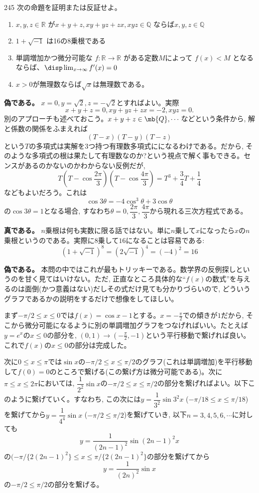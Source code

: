 \begin{thm}{245}{}{}
 次の命題を証明または反証せよ。
 \begin{enumerate}
  \item $x,y,z\in\mathbb{R}$ が$x+y+z,xy+yz+zx,xyz\in\mathbb{Q}$ ならば$x,y,z\in\mathbb{Q}$
  \item $1+\sqrt{-1}$ は16の8乗根である
  \item 単調増加かつ微分可能な $f:\mathbb{R}\rightarrow\mathbb{R}$ がある定数$M$によって $f(x)<M$ となるならば、$\disp \lim_{x\to\infty} f'(x)=0$
  \item $x>0$が無理数ならば$\sqrt{x}$は無理数である。
 \end{enumerate}
\end{thm}

\textbf{偽である。} $x=0, y=\sqrt{2}, z=-\sqrt{2}$とすればよい。実際
\[x+y+z = 0,  xy+yz+zx = -2, xyz = 0.\]
別のアプローチも述べておこう。$x+y+z\in \mb{Q},\cdots$などという条件から, 解と係数の関係をふまえれば
\[(T-x)(T-y)(T-z)\]
という$T$の多項式は実解を3つ持つ有理数多項式にになるわけである。だから, そのような多項式の根は果たして有理数なのか?という視点で解く事もできる。センスがあるのかないのかわからない反例だが,  
\[T(T-\cos{\dfrac{2\pi}{3}})(T-\cos{\dfrac{4\pi}{3}}) = T^3 + \dfrac{3}{4}T +\dfrac{1}{4}\]
などもよいだろう。これは
\[\cos{3\theta} = -4\cos^{3}{\theta} + 3\cos{\theta}\]
の$\cos{3\theta} = 1$となる場合, すなわち$\theta =0, \dfrac{2\pi}{3}, \dfrac{4\pi}{3}$から現れる三次方程式である。 

\textbf{真である。} $n$乗根は何も実数に限る話ではない。単に$n$乗して$x$になったら$x$の$n$乗根というのである。実際に8乗して$16$になることは容易である:
\[(1+\sqrt{-1})^8 = (2\sqrt{-1})^{4} = (-4)^2  = 16\]

\textbf{偽である。} 本問の中ではこれが最もトリッキーである。数学界の反例探しというのを甘く見てはいけない。ただ, 正直なところ具体的な``$f(x)$の数式''を与えるのは面倒(かつ意義はない)だしその式だけ見ても分かりづらいので, どういうグラフであるかの説明をするだけで想像をしてほしい。

まず$-\pi/2 \leq x\leq 0$では$f(x) = \cos{x} - 1$とする。$x=-\frac{\pi}{2}$での傾きが$1$だから, そこから微分可能になるように別の単調増加グラフをつなげればいい。たとえば$y=e^{x}$の$x\leq 0$の部分を, $(0,1)\to (-\frac{\pi}{2}, -1)$という平行移動で繋げれば良い。これで$f(x)$の$x\leq 0$の部分は完成した。

次に$0\leq x\leq \pi$では$\sin{x}$の$-\pi/2\leq x\leq \pi/2$のグラフ(これは単調増加)を平行移動して$f(0)=0$のところで繋げる(この繋げ方は微分可能である)。次に$\pi \leq x\leq 2\pi$においては, $\dfrac{1}{2^{2}}\sin{x}$の$-\pi/2\leq x\leq \pi/2$の部分を繋げればよい。以下このように繋げていく。すなわち, この次には$y=\dfrac{1}{3^{2}}\sin{3^2x}$ ($-\pi/18\leq x\leq\pi/18$)を繋げてから$y=\dfrac{1}{4^{4}}\sin{x}$ ($-\pi/2\leq \pi/2$)を繋げていき, 以下$n=3,4,5,6,\cdots$に対しても
\[y=\dfrac{1}{(2n-1)^2}\sin{(2n-1)^2x}\]
の$(-\pi/\{2(2n-1)^2\}\leq x\leq \pi/\{2(2n-1)^2\}$の部分を繋げてから
\[y=\dfrac{1}{(2n)^2}\sin{x}\]
の$-\pi/2\leq\pi/2$の部分を繋げる。

